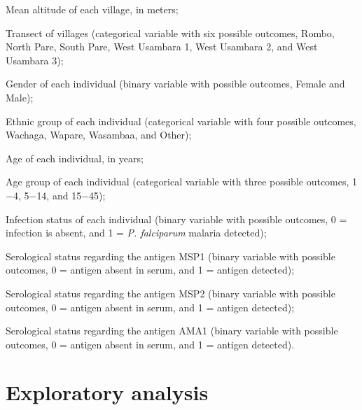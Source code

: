 \begin{description}[font=\normalfont\itshape]
\item [Altitude:]  Mean altitude of each village, in meters;
\item [Transect:]  Transect of villages (categorical variable with six possible outcomes, Rombo, North Pare, South Pare, West Usambara 1, West Usambara 2, and West Usambara 3);
\item [Gender:]  Gender of each individual (binary variable with possible outcomes, Female and Male);
\item [EthGp:]  Ethnic group of each individual (categorical variable with four possible outcomes, Wachaga, Wapare, Wasambaa, and Other);
\item [AgeYears:]  Age of each individual, in years;
\item [AgeGp:]  Age group of each individual (categorical variable with three possible outcomes, 1$-$4, 5$-$14, and 15$-$45);
\item [Infection:]  Infection status of each individual (binary variable with possible outcomes, 0 = infection is absent, and 1 = \textit{P. falciparum} malaria detected);
\item [MSP1:]  Serological status regarding the antigen MSP1 (binary variable with possible outcomes, 0 = antigen absent in serum, and 1 = antigen detected);
\item [MSP2:]  Serological status regarding the antigen MSP2 (binary variable with possible outcomes, 0 = antigen absent in serum, and 1 = antigen detected);
\item [AMA1:]  Serological status regarding the antigen AMA1 (binary variable with possible outcomes, 0 = antigen absent in serum, and 1 = antigen detected).
\end{description}

\section{Exploratory analysis}


